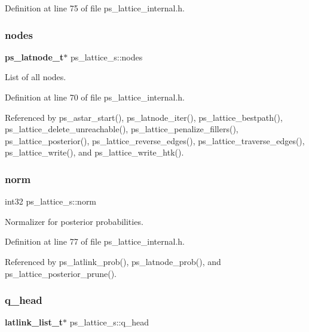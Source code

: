 Definition at line 75 of file ps\+\_\+lattice\+\_\+internal.\+h.

\mbox{\label{structps__lattice__s_a838bd9223e35d012419e6225b54e393d}} 
\subsubsection{nodes}
{\footnotesize\ttfamily \textbf{ ps\+\_\+latnode\+\_\+t}$\ast$ ps\+\_\+lattice\+\_\+s\+::nodes}



List of all nodes. 



Definition at line 70 of file ps\+\_\+lattice\+\_\+internal.\+h.



Referenced by ps\+\_\+astar\+\_\+start(), ps\+\_\+latnode\+\_\+iter(), ps\+\_\+lattice\+\_\+bestpath(), ps\+\_\+lattice\+\_\+delete\+\_\+unreachable(), ps\+\_\+lattice\+\_\+penalize\+\_\+fillers(), ps\+\_\+lattice\+\_\+posterior(), ps\+\_\+lattice\+\_\+reverse\+\_\+edges(), ps\+\_\+lattice\+\_\+traverse\+\_\+edges(), ps\+\_\+lattice\+\_\+write(), and ps\+\_\+lattice\+\_\+write\+\_\+htk().

\mbox{\label{structps__lattice__s_a68c3259613a16628e1dd2e8147705d8e}} 
\subsubsection{norm}
{\footnotesize\ttfamily int32 ps\+\_\+lattice\+\_\+s\+::norm}



Normalizer for posterior probabilities. 



Definition at line 77 of file ps\+\_\+lattice\+\_\+internal.\+h.



Referenced by ps\+\_\+latlink\+\_\+prob(), ps\+\_\+latnode\+\_\+prob(), and ps\+\_\+lattice\+\_\+posterior\+\_\+prune().

\mbox{\label{structps__lattice__s_a26c029189074db2f668d5a9d67eb7af5}} 
\subsubsection{q\+\_\+head}
{\footnotesize\ttfamily \textbf{ latlink\+\_\+list\+\_\+t}$\ast$ ps\+\_\+lattice\+\_\+s\+::q\+\_\+head}




